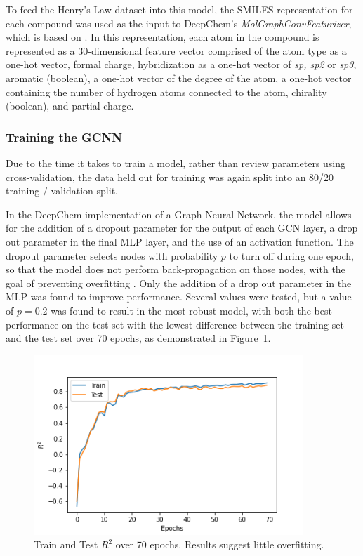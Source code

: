 \documentclass[12pt, oneside]{article}   	%
\begin{document}
	To feed the Henry's Law dataset into this model, the SMILES representation for each compound was used as the input to DeepChem's \emph{MolGraphConvFeaturizer}, which is based on \cite{Kearnes2016}. In this representation, each atom in the compound is represented as a 30-dimensional feature vector comprised of the atom type as a one-hot vector, formal charge, hybridization as a one-hot vector of \emph{sp, sp2} or \emph{sp3}, aromatic (boolean), a one-hot vector of the degree of the atom, a one-hot vector containing the number of hydrogen atoms connected to the atom, chirality (boolean), and partial charge.
	

\subsubsection{Training the GCNN}
	Due to the time it takes to train a model, rather than review parameters using cross-validation, the data held out for training was again split into an 80/20 training / validation split.
	
	In the DeepChem implementation of a Graph Neural Network, the model allows for the addition of a dropout parameter for the output of each GCN layer, a drop out parameter in the final MLP layer, and the use of an activation function. The dropout parameter selects nodes with probability $p$ to turn off during one epoch, so that the model does not perform back-propagation on those nodes, with the goal of preventing overfitting \cite{Srivastava2014}. Only the addition of a drop out parameter in the MLP was found to improve performance. Several values were tested, but a value of $p=0.2$ was found to result in the most robust model, with both the best performance on the test set with the lowest difference between the training set and the test set over 70 epochs, as demonstrated in Figure~\ref{fig:traintest}.
	
\begin{figure}[!h] %
   \centering
   \includegraphics[width=4in]{traintest.png} 
   \caption{Train and Test $R^2$ over 70 epochs. Results suggest little overfitting.}
   \label{fig:traintest}
\end{figure}
\end{document}
